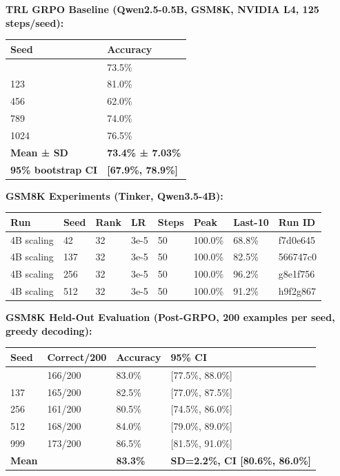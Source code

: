 \documentclass[
  american,
  11pt,
  a4paper,
  oneside]{report}
\newcounter{none} %
\begin{document}
\textbf{TRL GRPO Baseline (Qwen2.5-0.5B, GSM8K, NVIDIA L4, 125
steps/seed):}

{\def\LTcaptype{none} %
\begin{longtable}[]{@{}ll@{}}
\toprule\noalign{}
Seed & Accuracy \\
\midrule\noalign{}
\endhead
\bottomrule\noalign{}
\endlastfoot
42 & 73.5\% \\
123 & 81.0\% \\
456 & 62.0\% \\
789 & 74.0\% \\
1024 & 76.5\% \\
\textbf{Mean ± SD} & \textbf{73.4\% ± 7.03\%} \\
\textbf{95\% bootstrap CI} & \textbf{{[}67.9\%, 78.9\%{]}} \\
\end{longtable}
}

\textbf{GSM8K Experiments (Tinker, Qwen3.5-4B):}

{\def\LTcaptype{none} %
\begin{longtable}[]{@{}llllllll@{}}
\toprule\noalign{}
Run & Seed & Rank & LR & Steps & Peak & Last-10 & Run ID \\
\midrule\noalign{}
\endhead
\bottomrule\noalign{}
\endlastfoot
4B scaling & 42 & 32 & 3e-5 & 50 & 100.0\% & 68.8\% & f7d0e645 \\
4B scaling & 137 & 32 & 3e-5 & 50 & 100.0\% & 82.5\% & 566747c0 \\
4B scaling & 256 & 32 & 3e-5 & 50 & 100.0\% & 96.2\% & g8e1f756 \\
4B scaling & 512 & 32 & 3e-5 & 50 & 100.0\% & 91.2\% & h9f2g867 \\
\end{longtable}
}

\textbf{GSM8K Held-Out Evaluation (Post-GRPO, 200 examples per seed,
greedy decoding):}

{\def\LTcaptype{none} %
\begin{longtable}[]{@{}llll@{}}
\toprule\noalign{}
Seed & Correct/200 & Accuracy & 95\% CI \\
\midrule\noalign{}
\endhead
\bottomrule\noalign{}
\endlastfoot
42 & 166/200 & 83.0\% & {[}77.5\%, 88.0\%{]} \\
137 & 165/200 & 82.5\% & {[}77.0\%, 87.5\%{]} \\
256 & 161/200 & 80.5\% & {[}74.5\%, 86.0\%{]} \\
512 & 168/200 & 84.0\% & {[}79.0\%, 89.0\%{]} \\
999 & 173/200 & 86.5\% & {[}81.5\%, 91.0\%{]} \\
\textbf{Mean} & & \textbf{83.3\%} & \textbf{SD=2.2\%, CI {[}80.6\%,
86.0\%{]}} \\
\end{longtable}
}
\end{document}
